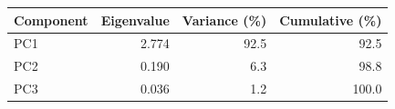 \begin{tabular}{lrrr}
\toprule
Component & Eigenvalue & Variance (\%) & Cumulative (\%) \\
\midrule
PC1 & 2.774 & 92.5 & 92.5 \\
PC2 & 0.190 & 6.3 & 98.8 \\
PC3 & 0.036 & 1.2 & 100.0 \\
\bottomrule
\end{tabular}
